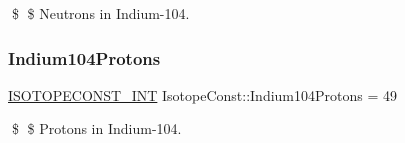 \$ \$ Neutrons in Indium-\/104. \mbox{\label{group___isotope_const-_indium-_in104_gacdd6667207c5d16a90cf0033566c947c}} 
\subsubsection{\texorpdfstring{Indium104\+Protons}{Indium104Protons}}
{\footnotesize\ttfamily \mbox{\hyperlink{group___isotope_const-_macros_ga5f18360b3e99483a35c32d789e62621c}{I\+S\+O\+T\+O\+P\+E\+C\+O\+N\+S\+T\+\_\+\+I\+NT}} Isotope\+Const\+::\+Indium104\+Protons = 49}

\$ \$ Protons in Indium-\/104. 